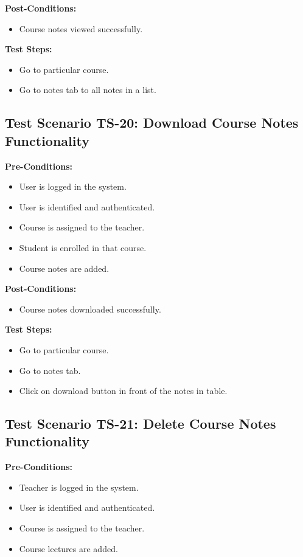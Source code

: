 \textbf{Post-Conditions: }
\begin{itemize}

\item Course notes viewed successfully.

\end{itemize}
\textbf{Test Steps:}
\begin{itemize}

\item Go to particular course.
\item Go to notes tab to all notes in a list.

\end{itemize}


\subsection{Test Scenario TS-20: Download Course Notes Functionality}
\textbf{Pre-Conditions: }
\begin{itemize}

\item User is logged in the system.
\item User is identified and authenticated.
\item Course is assigned to the teacher.
\item Student is enrolled in that course.
\item Course notes are added.

\end{itemize}

\textbf{Post-Conditions: }
\begin{itemize}

\item Course notes downloaded successfully.

\end{itemize}
\textbf{Test Steps:}
\begin{itemize}

\item Go to particular course.
\item Go to notes tab.
\item Click on download button in front of the notes in table.

\end{itemize}


\subsection{Test Scenario TS-21: Delete Course Notes Functionality}
\textbf{Pre-Conditions: }
\begin{itemize}

\item Teacher is logged in the system.
\item User is identified and authenticated.
\item Course is assigned to the teacher.
\item Course lectures are added.

\end{itemize}

